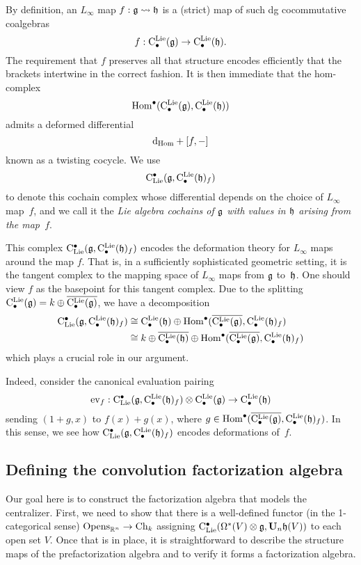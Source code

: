 \documentclass[11pt]{amsart}
\numberwithin{equation}{section}
\begin{document}
By definition, an $L_\infty$ map $f: \mathfrak g \rightsquigarrow \mathfrak h$ is a (strict) map of such dg cocommutative coalgebras
\[
f: {\rm C}^{\rm Lie}_\bullet(\mathfrak g) \to {\rm C}^{\rm Lie}_\bullet(\mathfrak h).
\]
The requirement that $f$ preserves all that structure encodes efficiently that the brackets intertwine in the correct fashion.
It is then immediate that the hom-complex
\[
{\rm Hom}^\bullet ({\rm C}^{\rm Lie}_\bullet(\mathfrak g), {\rm C}^{\rm Lie}_\bullet(\mathfrak h))
\]
admits a deformed differential
\[
{\rm d}_{\rm Hom} + [f,-]
\]
known as a twisting cocycle.
We use 
\[
{\rm C}_{\rm Lie}^\bullet(\mathfrak g,{\rm C}^{\rm Lie}_\bullet(\mathfrak h)_f)
\]
to denote this cochain complex whose differential depends on the choice of $L_\infty$ map~$f$,
and we call it the {\em Lie algebra cochains of $\mathfrak g$ with values in $\mathfrak h$ arising from the map~$f$}.

This complex ${\rm C}_{\rm Lie}^\bullet(\mathfrak g,{\rm C}^{\rm Lie}_\bullet(\mathfrak h)_f)$ encodes the deformation theory for $L_\infty$ maps around the map $f$.
That is, in a sufficiently sophisticated geometric setting, it is the tangent complex to the mapping space of $L_\infty$ maps from $\mathfrak g$ to~$\mathfrak h$.
One should view $f$ as the basepoint for this tangent complex.
Due to the splitting ${\rm C}^{\rm Lie}_\bullet(\mathfrak g) = k \oplus \overline{{\rm C}^{\rm Lie}_\bullet(\mathfrak g)}$,
we have a decomposition
\begin{align*}
{\rm C}_{\rm Lie}^\bullet(\mathfrak g,{\rm C}^{\rm Lie}_\bullet(\mathfrak h)_f) 
&\cong {\rm C}^{\rm Lie}_\bullet(\mathfrak h) \oplus {\rm Hom}^\bullet(\overline{{\rm C}^{\rm Lie}_\bullet(\mathfrak g)}, {\rm C}^{\rm Lie}_\bullet(\mathfrak h)_f)\\
&\cong k \oplus \overline{{\rm C}^{\rm Lie}_\bullet(\mathfrak h)} \oplus {\rm Hom}^\bullet(\overline{{\rm C}^{\rm Lie}_\bullet(\mathfrak g)}, {\rm C}^{\rm Lie}_\bullet(\mathfrak h)_f)
\end{align*}
which plays a crucial role in our argument.

Indeed, consider the canonical evaluation pairing
\[
{\rm ev}_{f}: {\rm C}_{\rm Lie}^\bullet(\mathfrak g,{\rm C}^{\rm Lie}_\bullet(\mathfrak h)_f) \otimes {\rm C}^{\rm Lie}_\bullet(\mathfrak g) \to {\rm C}^{\rm Lie}_\bullet(\mathfrak h)
\]
sending $(1 + g, x)$ to $f(x) + g(x)$, where $g \in {\rm Hom}^\bullet(\overline{{\rm C}^{\rm Lie}_\bullet(\mathfrak g)}, {\rm C}^{\rm Lie}_\bullet(\mathfrak h)_f)$.
In this sense, we see how ${\rm C}_{\rm Lie}^\bullet(\mathfrak g,{\rm C}^{\rm Lie}_\bullet(\mathfrak h)_f)$ encodes deformations of~$f$.

\subsection{Defining the convolution factorization algebra}
\label{sec: dfn of centralizer fact alg}

Our goal here is to construct the factorization algebra that models the centralizer.
First, we need to show that there is a well-defined functor (in the 1-categorical sense) ${\rm Opens}_{\mathbb R^n} \to {\rm Ch}_k$ assigning ${\rm C}_{\rm Lie}^\bullet(\Omega^*(V) \otimes \mathfrak g, \mathbf U_n \mathfrak h(V))$ to each open set $V$.
Once that is in place, it is straightforward to describe the structure maps of the prefactorization algebra and to verify it forms a factorization algebra.
\end{document}
